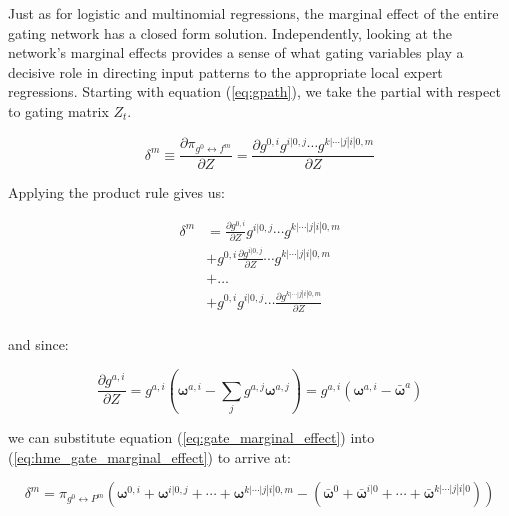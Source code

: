 \documentclass[12pt]{article}
\newcommand{\mean}[1]{\bar{#1}}
\newcommand{\gateprod}[2]{\pi_{#1 \longleftrightarrow #2}}
\begin{document}
Just as for logistic and multinomial regressions, the
marginal effect of the entire gating network has a closed form solution.
Independently, looking at the network's marginal effects provides a sense
of what gating variables play a decisive role in directing input patterns
to the appropriate local expert regressions. Starting with equation
(\ref{eq:gpath}), we take the partial with respect to gating matrix $Z_{t}$.

\begin{equation}
  \delta^{m} \equiv \frac{\partial \gateprod{g^{0}}{f^{m}}}{\partial Z} = \frac{\partial g^{0, i} g^{i|0, j} \cdots g^{k|\cdots|j|i|0, m}}{\partial Z}
\end{equation}

Applying the product rule gives us:

\begin{equation} \label{eq:hme_gate_marginal_effect}
  \begin{split}
    \delta^{m} &= \frac{\partial g^{0, i}}{\partial Z} g^{i|0, j} \cdots g^{k|\cdots|j|i|0, m} \\
                                     &+ g^{0, i} \frac{\partial g^{i|0, j}}{\partial Z} \cdots g^{k|\cdots|j|i|0, m} \\
                                     &+ \dots                                                                        \\
                                     &+ g^{0, i} g^{i|0, j} \cdots \frac{\partial g^{k|\cdots|j|i|0, m}}{\partial Z} \\
  \end{split}
\end{equation}

and since:

\begin{equation} \label{eq:gate_marginal_effect}
  \frac{\partial g^{a, i}}{\partial Z} = g^{a, i} \left( \boldsymbol{\omega}^{a, i} - \sum_{j} g^{a, j} \boldsymbol{\omega}^{a, j} \right) = g^{a, i} \left( \boldsymbol{\omega}^{a, i} - \mean{\boldsymbol{\omega}}^{a} \right)
\end{equation}

we can substitute equation (\ref{eq:gate_marginal_effect}) into
(\ref{eq:hme_gate_marginal_effect}) to arrive at:

\begin{equation} \label{eq:marginal_effects}
  \delta^{m} = \gateprod{g^{0}}{P^{m}} \left(\boldsymbol{\omega}^{0, i} + \boldsymbol{\omega}^{i|0, j} + \cdots + \boldsymbol{\omega}^{k|\cdots|j|i|0, m} - \left( \mean{\boldsymbol{\omega}}^{0} + \mean{\boldsymbol{\omega}}^{i|0} + \cdots + \mean{\boldsymbol{\omega}}^{k|\cdots|j|i|0} \right) \right)
\end{equation}
\end{document}
